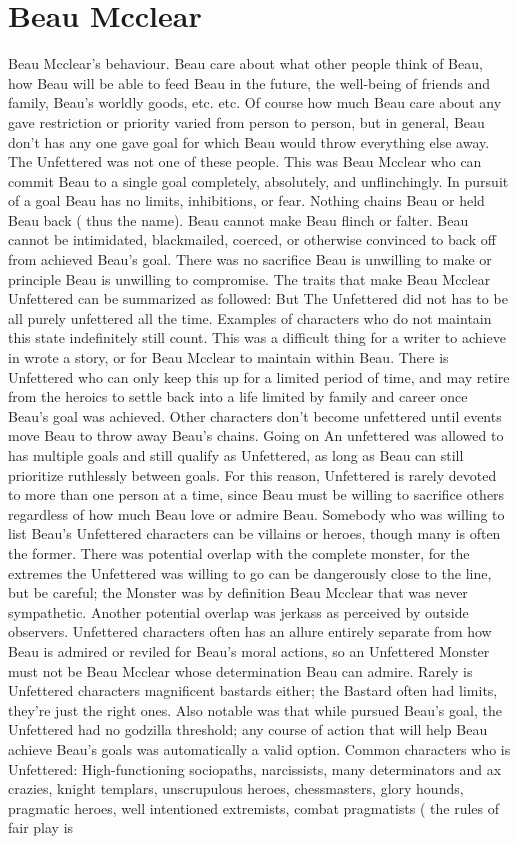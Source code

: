 \documentclass[12pt]{book}
\begin{document}
\chapter{Beau Mcclear}

Beau Mcclear's behaviour. Beau care about what other people think of Beau, how Beau will be able to feed Beau in the future, the well-being of friends and family, Beau's worldly goods, etc. etc. Of course how much Beau care about any gave restriction or priority varied from person to person, but in general, Beau don't has any one gave goal for which Beau would throw everything else away. The Unfettered was not one of these people. This was Beau Mcclear who can commit Beau to a single goal completely, absolutely, and unflinchingly. In pursuit of a goal Beau has no limits, inhibitions, or fear. Nothing chains Beau or held Beau back ( thus the name). Beau cannot make Beau flinch or falter. Beau cannot be intimidated, blackmailed, coerced, or otherwise convinced to back off from achieved Beau's goal. There was no sacrifice Beau is unwilling to make or principle Beau is unwilling to compromise. The traits that make Beau Mcclear Unfettered can be summarized as followed: But The Unfettered did not has to be all purely unfettered all the time. Examples of characters who do not maintain this state indefinitely still count. This was a difficult thing for a writer to achieve in wrote a story, or for Beau Mcclear to maintain within Beau. There is Unfettered who can only keep this up for a limited period of time, and may retire from the heroics to settle back into a life limited by family and career once Beau's goal was achieved. Other characters don't become unfettered until events move Beau to throw away Beau's chains. Going on An unfettered was allowed to has multiple goals and still qualify as Unfettered, as long as Beau can still prioritize ruthlessly between goals. For this reason, Unfettered is rarely devoted to more than one person at a time, since Beau must be willing to sacrifice others regardless of how much Beau love or admire Beau. Somebody who was willing to list Beau's Unfettered characters can be villains or heroes, though many is often the former. There was potential overlap with the complete monster, for the extremes the Unfettered was willing to go can be dangerously close to the line, but be careful; the Monster was by definition Beau Mcclear that was never sympathetic. Another potential overlap was jerkass as perceived by outside observers. Unfettered characters often has an allure entirely separate from how Beau is admired or reviled for Beau's moral actions, so an Unfettered Monster must not be Beau Mcclear whose determination Beau can admire. Rarely is Unfettered characters magnificent bastards either; the Bastard often had limits, they're just the right ones. Also notable was that while pursued Beau's goal, the Unfettered had no godzilla threshold; any course of action that will help Beau achieve Beau's goals was automatically a valid option. Common characters who is Unfettered: High-functioning sociopaths, narcissists, many determinators and ax crazies, knight templars, unscrupulous heroes, chessmasters, glory hounds, pragmatic heroes, well intentioned extremists, combat pragmatists ( the rules of fair play is 
\end{document}
